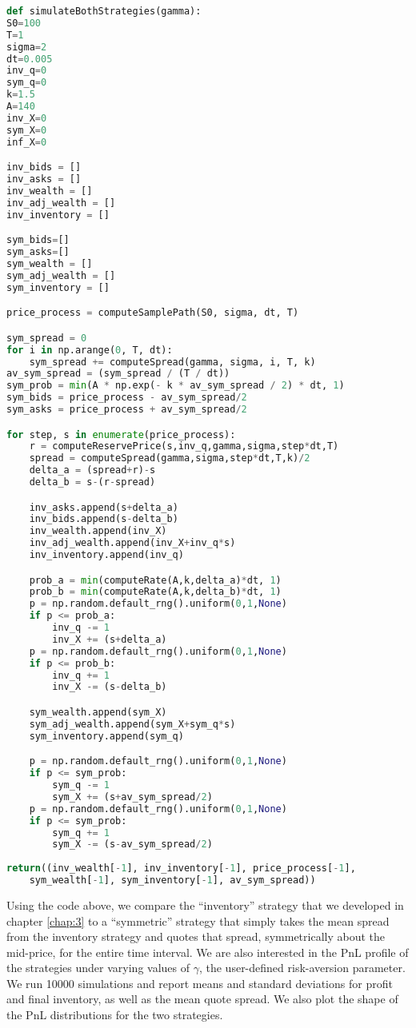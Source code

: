 \newpage
\begin{lstlisting}[language=Python, caption=Avellaneda-Stoikov Model]
def simulateBothStrategies(gamma):
S0=100
T=1
sigma=2
dt=0.005
inv_q=0
sym_q=0
k=1.5
A=140
inv_X=0
sym_X=0
inf_X=0

inv_bids = []
inv_asks = []
inv_wealth = []
inv_adj_wealth = []
inv_inventory = []

sym_bids=[]
sym_asks=[]
sym_wealth = []
sym_adj_wealth = []
sym_inventory = []

price_process = computeSamplePath(S0, sigma, dt, T)

sym_spread = 0
for i in np.arange(0, T, dt):
    sym_spread += computeSpread(gamma, sigma, i, T, k)
av_sym_spread = (sym_spread / (T / dt))
sym_prob = min(A * np.exp(- k * av_sym_spread / 2) * dt, 1)
sym_bids = price_process - av_sym_spread/2
sym_asks = price_process + av_sym_spread/2

for step, s in enumerate(price_process):
    r = computeReservePrice(s,inv_q,gamma,sigma,step*dt,T)
    spread = computeSpread(gamma,sigma,step*dt,T,k)/2
    delta_a = (spread+r)-s
    delta_b = s-(r-spread)

    inv_asks.append(s+delta_a)
    inv_bids.append(s-delta_b)
    inv_wealth.append(inv_X)
    inv_adj_wealth.append(inv_X+inv_q*s)
    inv_inventory.append(inv_q)

    prob_a = min(computeRate(A,k,delta_a)*dt, 1)
    prob_b = min(computeRate(A,k,delta_b)*dt, 1)
    p = np.random.default_rng().uniform(0,1,None)
    if p <= prob_a:
        inv_q -= 1
        inv_X += (s+delta_a)
    p = np.random.default_rng().uniform(0,1,None)
    if p <= prob_b:
        inv_q += 1
        inv_X -= (s-delta_b)

    sym_wealth.append(sym_X)
    sym_adj_wealth.append(sym_X+sym_q*s)
    sym_inventory.append(sym_q)

    p = np.random.default_rng().uniform(0,1,None)
    if p <= sym_prob:
        sym_q -= 1
        sym_X += (s+av_sym_spread/2)
    p = np.random.default_rng().uniform(0,1,None)
    if p <= sym_prob:
        sym_q += 1
        sym_X -= (s-av_sym_spread/2)
    
return((inv_wealth[-1], inv_inventory[-1], price_process[-1],
    sym_wealth[-1], sym_inventory[-1], av_sym_spread))
\end{lstlisting}

Using the code above, we compare the ``inventory'' strategy that 
we developed in chapter \ref{chap:3} to a ``symmetric'' strategy 
that simply takes the mean spread from the inventory strategy and
quotes that spread, symmetrically about the mid-price, for the 
entire time interval. We are also interested in the PnL profile 
of the strategies under varying values of $\gamma$, the user-defined
risk-aversion parameter. We run 10000 simulations and report means and 
standard deviations for profit and final inventory, as well as the 
mean quote spread. We also plot the shape of the PnL distributions 
for the two strategies.


